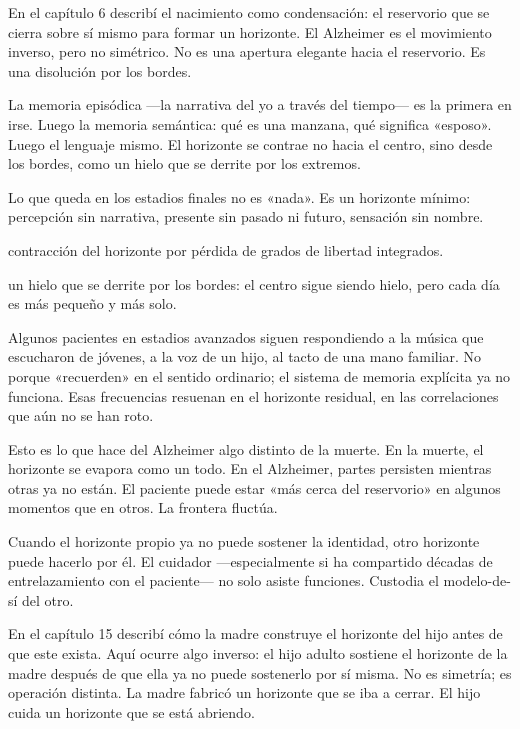 \noindent En el capítulo 6 describí el nacimiento como condensación: el reservorio que se cierra sobre sí mismo para formar un horizonte. El Alzheimer es el movimiento inverso, pero no simétrico. No es una apertura elegante hacia el reservorio. Es una disolución por los bordes.

La memoria episódica —la narrativa del yo a través del tiempo— es la primera en irse. Luego la memoria semántica: qué es una manzana, qué significa «esposo». Luego el lenguaje mismo. El horizonte se contrae no hacia el centro, sino desde los bordes, como un hielo que se derrite por los extremos.

Lo que queda en los estadios finales no es «nada». Es un horizonte mínimo: percepción sin narrativa, presente sin pasado ni futuro, sensación sin nombre.

\begin{fisica}
 contracción del horizonte por pérdida de grados de libertad integrados.

 un hielo que se derrite por los bordes: el centro sigue siendo hielo, pero cada día es más pequeño y más solo.
\end{fisica}
Algunos pacientes en estadios avanzados siguen respondiendo a la música que escucharon de jóvenes, a la voz de un hijo, al tacto de una mano familiar. No porque «recuerden» en el sentido ordinario; el sistema de memoria explícita ya no funciona. Esas frecuencias resuenan en el horizonte residual, en las correlaciones que aún no se han roto.

Esto es lo que hace del Alzheimer algo distinto de la muerte. En la muerte, el horizonte se evapora como un todo. En el Alzheimer, partes persisten mientras otras ya no están. El paciente puede estar «más cerca del reservorio» en algunos momentos que en otros. La frontera fluctúa.

\noindent Cuando el horizonte propio ya no puede sostener la identidad, otro horizonte puede hacerlo por él. El cuidador —especialmente si ha compartido décadas de entrelazamiento con el paciente— no solo asiste funciones. Custodia el modelo-de-sí del otro.

En el capítulo 15 describí cómo la madre construye el horizonte del hijo antes de que este exista. Aquí ocurre algo inverso: el hijo adulto sostiene el horizonte de la madre después de que ella ya no puede sostenerlo por sí misma. No es simetría; es operación distinta. La madre fabricó un horizonte que se iba a cerrar. El hijo cuida un horizonte que se está abriendo.

